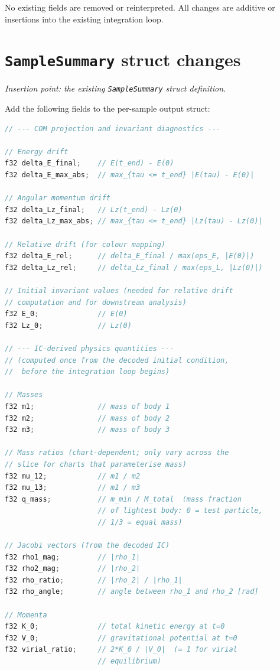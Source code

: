 \documentclass[11pt]{article}
\newcommand{\struct}[1]{\texttt{#1}}
\begin{document}
No existing fields are removed or reinterpreted. All changes are additive or
insertions into the existing integration loop.

\section{\texttt{SampleSummary} struct changes}
\label{sec:struct_changes}

\textit{Insertion point: the existing \struct{SampleSummary} struct definition.}

Add the following fields to the per-sample output struct:

\begin{lstlisting}[language=C]
// --- COM projection and invariant diagnostics ---

// Energy drift
f32 delta_E_final;    // E(t_end) - E(0)
f32 delta_E_max_abs;  // max_{tau <= t_end} |E(tau) - E(0)|

// Angular momentum drift
f32 delta_Lz_final;   // Lz(t_end) - Lz(0)
f32 delta_Lz_max_abs; // max_{tau <= t_end} |Lz(tau) - Lz(0)|

// Relative drift (for colour mapping)
f32 delta_E_rel;      // delta_E_final / max(eps_E, |E(0)|)
f32 delta_Lz_rel;     // delta_Lz_final / max(eps_L, |Lz(0)|)

// Initial invariant values (needed for relative drift
// computation and for downstream analysis)
f32 E_0;              // E(0)
f32 Lz_0;             // Lz(0)

// --- IC-derived physics quantities ---
// (computed once from the decoded initial condition,
//  before the integration loop begins)

// Masses
f32 m1;               // mass of body 1
f32 m2;               // mass of body 2
f32 m3;               // mass of body 3

// Mass ratios (chart-dependent; only vary across the
// slice for charts that parameterise mass)
f32 mu_12;            // m1 / m2
f32 mu_13;            // m1 / m3
f32 q_mass;           // m_min / M_total  (mass fraction
                      // of lightest body: 0 = test particle,
                      // 1/3 = equal mass)

// Jacobi vectors (from the decoded IC)
f32 rho1_mag;         // |rho_1|
f32 rho2_mag;         // |rho_2|
f32 rho_ratio;        // |rho_2| / |rho_1|
f32 rho_angle;        // angle between rho_1 and rho_2 [rad]

// Momenta
f32 K_0;              // total kinetic energy at t=0
f32 V_0;              // gravitational potential at t=0
f32 virial_ratio;     // 2*K_0 / |V_0|  (= 1 for virial
                      // equilibrium)


\end{lstlisting}
\end{document}
